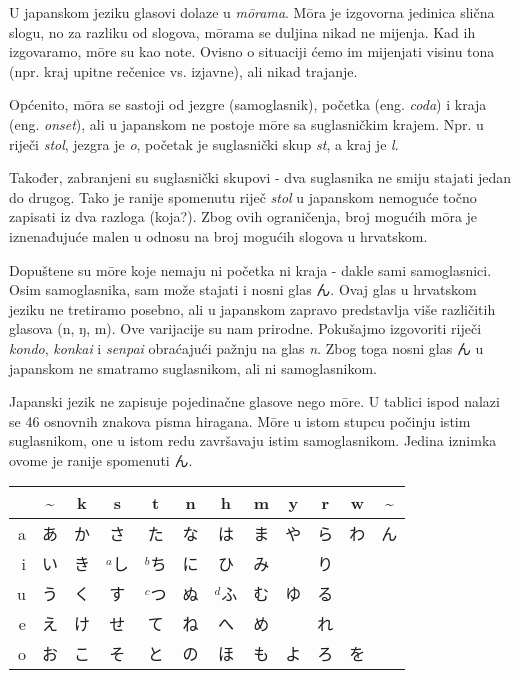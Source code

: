 
\author{autor}

	
	
	U japanskom jeziku glasovi dolaze u \textit{m\={o}rama}. M\={o}ra je izgovorna jedinica slična slogu, no za razliku od slogova, m\={o}rama se duljina nikad ne mijenja. Kad ih izgovaramo, m\={o}re su kao note. Ovisno o situaciji ćemo im mijenjati visinu tona (npr. kraj upitne rečenice vs. izjavne), ali nikad trajanje.
	
	Općenito, m\={o}ra se sastoji od jezgre (samoglasnik), početka (eng. \textit{coda}) i kraja (eng. \textit{onset}), ali u japanskom ne postoje m\={o}re sa suglasničkim krajem. Npr. u riječi \textit{stol}, jezgra je \textit{o}, početak je suglasnički skup \textit{st}, a kraj je \textit{l}.
	
	Također, zabranjeni su suglasnički skupovi - dva suglasnika ne smiju stajati jedan do drugog. Tako je ranije spomenutu riječ \textit{stol} u japanskom nemoguće točno zapisati iz dva razloga (koja?). Zbog ovih ograničenja, broj mogućih m\={o}ra je iznenađujuće malen u odnosu na broj mogućih slogova u hrvatskom.
	
	Dopuštene su m\={o}re koje nemaju ni početka ni kraja - dakle sami samoglasnici. Osim samoglasnika, sam može stajati i nosni glas ん. Ovaj glas u hrvatskom jeziku ne tretiramo posebno, ali u japanskom zapravo predstavlja više različitih glasova (n, ŋ, m). Ove varijacije su nam prirodne. Pokušajmo izgovoriti riječi \textit{kondo}, \textit{konkai} i \textit{senpai} obraćajući pažnju na glas \textit{n}. Zbog toga nosni glas ん u japanskom ne smatramo suglasnikom, ali ni samoglasnikom.
	
	
	Japanski jezik ne zapisuje pojedinačne glasove nego m\={o}re. U tablici ispod nalazi se 46 osnovnih znakova pisma hiragana. M\={o}re u istom stupcu počinju istim suglasnikom, one u istom redu završavaju istim samoglasnikom. Jedina iznimka ovome je ranije spomenuti ん.
	
	\setlength{\tabcolsep}{10pt}
	\vspace{10pt}
	\begin{tabular}{|r|c|c|c|c|c|c|c|c|c|c|c|}
		\hline
		&\textasciitilde&k&s&t&n&h&m&y&r&w&\textasciitilde\\
		\hline
		a&あ&か&さ&た&な&は&ま&や&ら&わ&ん\\
		i&い&き&$^a$し&$^b$ち&に&ひ&み&&り&&\\
		u&う&く&す&$^c$つ&ぬ&$^d$ふ&む&ゆ&る&&\\
		e&え&け&せ&て&ね&へ&め&&れ&&\\
		o&お&こ&そ&と&の&ほ&も&よ&ろ&を&\\
		\hline
	\end{tabular}
	
